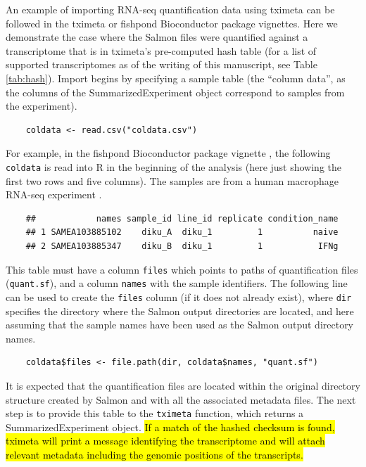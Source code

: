 An example of importing RNA-seq quantification data using tximeta can
be followed in the tximeta or fishpond Bioconductor package
vignettes. Here we demonstrate the case where the Salmon files were
quantified against a transcriptome that is in tximeta's pre-computed
hash table (for a list of supported transcriptomes as of the writing
of this manuscript, see Table \ref{tab:hash}). Import begins by specifying
a sample table (the ``column data'', as the columns of the
SummarizedExperiment object correspond to samples from the
experiment).

\begin{verbatim}
    coldata <- read.csv("coldata.csv")
\end{verbatim}

For example, in the fishpond Bioconductor package vignette \cite{swish}, the
following \texttt{coldata} is read into R in the beginning of the
analysis (here just showing the first two rows and five columns). The
samples are from a human macrophage RNA-seq experiment \cite{alasoo}.

\begin{verbatim}
    ##            names sample_id line_id replicate condition_name
    ## 1 SAMEA103885102    diku_A  diku_1         1          naive
    ## 2 SAMEA103885347    diku_B  diku_1         1           IFNg
\end{verbatim}

This table must have a column \texttt{files} which points to paths of
quantification files (\texttt{quant.sf}), and a column \texttt{names} with the sample
identifiers. The following line can be used to create the
\texttt{files} column (if it does not already exist), where \texttt{dir}
specifies the directory where the Salmon output directories are
located, and here assuming that the sample names have been used as the
Salmon output directory names. 

\begin{verbatim}
    coldata$files <- file.path(dir, coldata$names, "quant.sf")
\end{verbatim}

It is expected that the quantification files are located
within the original directory structure created by Salmon and with all
the associated metadata files. The next
step is to provide this table to the \texttt{tximeta} function, which
returns a SummarizedExperiment object. \hl{If a match of the hashed
checksum is found, tximeta will print a message identifying the
transcriptome and will attach relevant metadata including the genomic
positions of the transcripts.}

